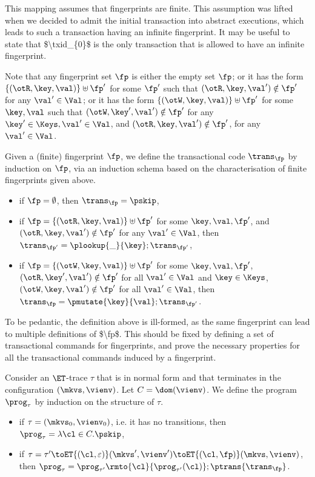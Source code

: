 \begin{definition}
\label{def:fp2prog}
\ac{This mapping assumes that fingerprints are finite. This assumption was lifted when we 
decided to admit the initial transaction into abstract executions, which leads to such a transaction 
having an infinite fingerprint. It may be useful to state that $\txid_{0}$ is the only transaction that is 
allowed to have an infinite fingerprint.}

Note that any fingerprint set 
$\fp$ is either the empty set $\fp$; or it has the form $\{(\otR, \key, \val)\} \uplus \fp'$ for 
some $\fp'$ such that $(\otR, \key, \val') \notin \fp'$ for any $\val' \in \Val$; 
or it has the form $\{(\otW, \key, \val)\} \uplus \fp'$ for some $\key, \val$ such that 
$(\otW, \key', \val') \notin \fp'$ for any $\key' \in \Keys, \val' \in \Val$, and 
$(\otR, \key, \val') \notin \fp'$, for any $\val' \in \Val$.  

Given a (finite) fingerprint $\fp$, we define the transactional code $\trans_{\fp}$ by induction 
on $\fp$, via an induction schema based on the characterisation of finite fingerprints given above.
\begin{itemize}
\item if $\fp = \emptyset$, then $\trans_{\fp} = \pskip$, 
\item if $\fp = \{(\otR, \key, \val)\} \uplus \fp'$ for some $\key, \val, \fp'$, and $(\otR,\key,\val') \notin \fp'$ for any 
$\val' \in \Val$, then $\trans_{\fp'} = \plookup{\_}{\key} ; \trans_{\fp'}$, 
\item if $\fp = \{(\otW, \key, \val)\} \uplus \fp'$ for some $\key, \val, \fp'$, $(\otR,\key', \val') \notin \fp'$ for all 
$\val' \in \Val$ and $\key \in \Keys$, $(\otW, \key, \val') \notin \fp'$ for all $\val' \in \Val$, 
then $\trans_{\fp} = \pmutate{\key}{\val} ; \trans_{\fp'}$.
\end{itemize}
\ac{To be pedantic, the definition above is ill-formed, as the same fingerprint can lead to multiple 
definitions of $\fp$. This should be fixed by defining a set of transactional commands for 
fingerprints, and prove the necessary properties for all the transactional commands induced 
by a fingerprint.}

Consider an $\ET$-trace $\tau$ that is in normal form and that terminates in the configuration $(\mkvs, \vienv)$. Let $C = \dom(\vienv)$. 
We define the program $\prog_{\tau}$ by induction on the structure of $\tau$. 
\begin{itemize}
\item if $\tau = (\mkvs_{0}, \vienv_{0})$, i.e. it has no transitions, then $\prog_{\tau} = \lambda \cl \in C. \pskip$, 
\item if $\tau = \tau' \toET{(\cl, \varepsilon)} (\mkvs', \vienv') \toET{(\cl, \fp)} (\mkvs, \vienv)$, then 
$\prog_{\tau} = \prog_{\tau'}\rmto{\cl}{\prog_{\tau'}(\cl)}; \ptrans{\trans_{\fp}}$.
\end{itemize}
\end{definition}


